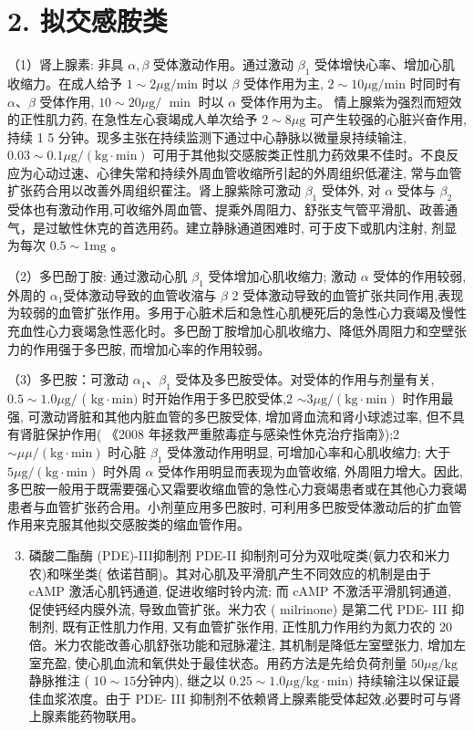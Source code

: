 \documentclass[10pt]{article}
\begin{document}
\section*{2. 拟交感胺类}
（1）肾上腺素: 非具 $\alpha, \beta$ 受体激动作用。通过激动 $\beta_{1}$ 受体增快心率、增加心肌收缩力。在成人给予 $1 \sim 2 \mu \mathrm{g} / \mathrm{min}$ 时以 $\beta$ 受体作用为主, $2 \sim 10 \mu \mathrm{g} / \mathrm{min}$ 时同时有 $\alpha 、 \beta$ 受体作用, $10 \sim 20 \mu \mathrm{g} /$ $\min$ 时以 $\alpha$ 受体作用为主。 情上腺紫为强烈而短效的正性肌力药, 在急性左心衰竭成人单次给予 $2 \sim 8 \mu \mathrm{g}$ 可产生较强的心脏兴奋作用,持续 1 5 分钟。现多主张在持续监测下通过中心静脉以微量泉持续输注, $0.03 \sim 0.1 \mu \mathrm{g} /(\mathrm{kg} \cdot \mathrm{min})$ 可用于其他拟交感胺类正性肌力药效果不佳时。不良反应为心动过速、心律失常和持续外周血管收缩所引起的外周组织低灌注, 常与血管扩张药合用以改善外周组织䍜注。肾上腺紫除可激动 $\beta_{1}$ 受体外, 对 $\alpha$ 受体与 $\beta_{2}$ 受体也有激动作用,可收缩外周血管、提乘外周阻力、舒张支气管平滑肌、政善通气，是过敏性休克的首选用药。建立静脉通道困难时, 可于皮下或肌内注射, 剂显为每次 $0.5 \sim 1 \mathrm{mg}$ 。

（2）多巴酚丁胺: 通过激动心肌 $\beta_{1}$ 受体增加心肌收缩力; 激动 $\alpha$ 受体的作用较弱,外周的 $\alpha_{1}$受体激动导致的血管收㴼与 $\beta$ 2 受体激动导致的血管扩张共同作用,表现为较弱的血管扩张作用。多用于心脏术后和急性心肌梗死后的急性心力衰竭及慢性充血性心力衰竭急性恶化时。多巴酚丁胺增加心肌收缩力、降低外周阻力和空壁张力的作用强于多巴胺, 而增加心率的作用较弱。

（3）多巴胺：可激动 $\alpha_{1} 、 \beta_{1}$ 受体及多巴胺受体。对受体的作用与剂量有关, $0.5 \sim 1.0 \mu \mathrm{g} /$ ( $\mathrm{kg} \cdot \mathrm{min})$ 时开始作用于多巴胶受体,2 $\sim 3 \mu \mathrm{g} /(\mathrm{kg} \cdot \mathrm{min})$ 时作用最强, 可激动肾脏和其他内脏血管的多巴胺受体, 增加肾血流和肾小球滤过率, 但不具有肾脏保护作用( 《2008 年拯救严重脓毒症与感染性休克治疗指南》);2 $\sim \mu \mu /(\mathrm{kg} \cdot \mathrm{min})$ 时心脏 $\beta_{1}$ 受体激动作用明显, 可增加心率和心肌收缩力; 大于 $5 \mu \mathrm{g} /(\mathrm{kg} \cdot \mathrm{min})$ 时外周 $\alpha$ 受体作用明显而表现为血管收缩, 外周阻力增大。因此, 多巴胺一般用于既需要强心又霜要收缩血管的急性心力衰竭患者或在其他心力衰竭患者与血管扩张药合用。小剂荲应用多巴胺时, 可利用多巴胺受体激动后的扩血管作用来克服其他拟交感胺类的缩血管作用。

\begin{enumerate}
  \setcounter{enumi}{2}
  \item 磷酸二酯酶 (PDE)-III抑制剂 PDE-II 抑制剂可分为双吡啶类(氨力农和米力农)和咪坐类( 依诺䒤酮)。其对心肌及平滑肌产生不同效应的机制是由于 cAMP 激活心肌钙通道, 促进收缩时铃内流; 而 cAMP 不激活平滑肌钶通道, 促使钙经内膜外流, 导致血管扩张。米力农 ( milrinone) 是第二代 PDE- III 抑制剂, 既有正性肌力作用, 又有血管扩张作用, 正性肌力作用约为氮力农的 20 倍。米力农能改善心肌舒张功能和冠脉灌注, 其机制是降低左室壁张力, 增加左室充盈, 使心肌血流和氧供处于最佳状态。用药方法是先给负荷剂量 $50 \mu \mathrm{g} / \mathrm{kg}$ 静脉推注 ( $10 \sim 15$分钟内), 继之以 $0.25 \sim 1.0 \mu \mathrm{g} / \mathrm{kg} \cdot \mathrm{min})$ 持续输注以保证最佳血浆浓度。由于 PDE- III 抑制剂不依赖肾上腺素能受体起效,必要时可与肾上腺素能药物联用。
\end{enumerate}
\end{document}

